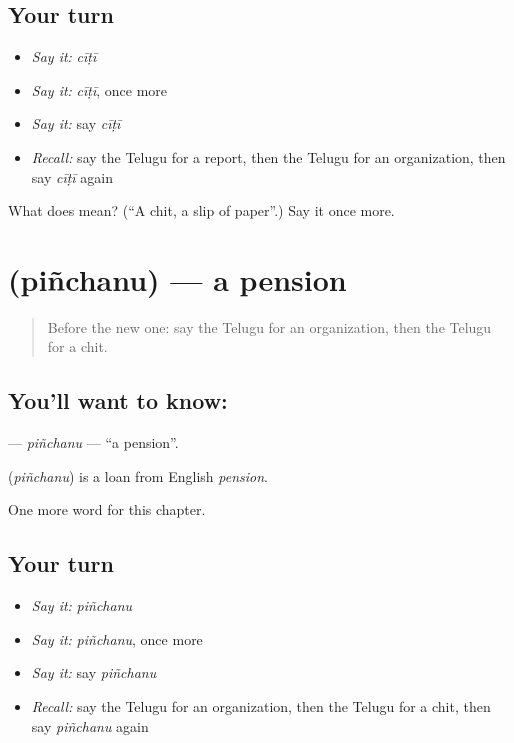 \subsection*{Your turn}
\begin{itemize}
\raggedright
  \item \emph{Say it:} \emph{cīṭī}
  \item \emph{Say it:} \emph{cīṭī}, once more
  \item \emph{Say it:} say \emph{cīṭī}
  \item \emph{Recall:} say the Telugu for a report, then the Telugu for an organization, then say \emph{cīṭī} again
\end{itemize}

\begin{tcolorbox}[breakable,colback=teal!4,colframe=teal!35!black,title={Before you move on}]
What does  mean? (\textquotedblleft{}A chit, a slip of paper\textquotedblright{}.) Say it once more.
\end{tcolorbox}
\section[\texorpdfstring{\te{పింఛను} (piñchanu)}{పింఛను (piñchanu)}]{ (piñchanu) — a pension}

\label{lesson:TE-C239-pinchanu}



\begin{quote}
Before the new one: say the Telugu for an organization, then the Telugu for a chit.
\end{quote}

\subsection*{You'll want to know: }
\textbf{} — \emph{piñchanu} — \textquotedblleft{}a pension\textquotedblright{}.

\begin{cousinweb}
\textbf{} (\emph{piñchanu}) is a loan from English \emph{pension}.
\end{cousinweb}

\begin{grammarlens}[title={What you've built}]
One more word for this chapter.
\end{grammarlens}

\subsection*{Your turn}
\begin{itemize}
\raggedright
  \item \emph{Say it:} \emph{piñchanu}
  \item \emph{Say it:} \emph{piñchanu}, once more
  \item \emph{Say it:} say \emph{piñchanu}
  \item \emph{Recall:} say the Telugu for an organization, then the Telugu for a chit, then say \emph{piñchanu} again
\end{itemize}

